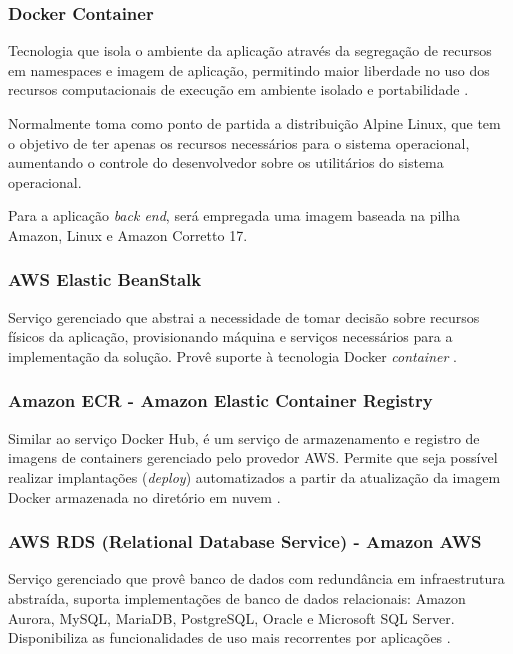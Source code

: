 \documentclass[
    12pt,               %
    openright,          %
    oneside,
    a4paper,            %
    BIBLATEX,           %
    TODO,               %
    english,            %
    brazil              %
    ]{ifsp-spo-inf-ctds}
\begin{document}
        \subsubsection{Docker Container}

            Tecnologia que isola o ambiente da aplicação através da segregação de recursos em namespaces e imagem de aplicação, permitindo maior liberdade no uso dos recursos computacionais de execução em ambiente isolado e portabilidade .

            Normalmente toma como ponto de partida a distribuição Alpine Linux, que tem o objetivo de ter apenas os recursos necessários para o sistema operacional, aumentando o controle do desenvolvedor sobre os utilitários do sistema operacional.

            Para a aplicação \emph{back end}, será empregada uma imagem baseada na pilha Amazon, Linux e Amazon Corretto 17.

        \subsubsection{AWS Elastic BeanStalk}

            Serviço gerenciado que abstrai a necessidade de tomar decisão sobre recursos físicos da aplicação, provisionando máquina e serviços necessários para a implementação da solução. Provê suporte à tecnologia Docker \emph{container} .

        \subsubsection{Amazon ECR - Amazon Elastic Container Registry}

            Similar ao serviço Docker Hub, é um serviço de armazenamento e registro de imagens de containers gerenciado pelo provedor AWS. Permite que seja possível realizar implantações (\emph{deploy}) automatizados a partir da atualização da imagem Docker armazenada no diretório em nuvem .

        \subsubsection{AWS RDS (Relational Database Service) - Amazon AWS}

            Serviço gerenciado que provê banco de dados com redundância em infraestrutura abstraída, suporta implementações de banco de dados relacionais: Amazon Aurora, MySQL, MariaDB, PostgreSQL, Oracle e Microsoft SQL Server. Disponibiliza as funcionalidades de uso mais recorrentes por aplicações .
\end{document}

